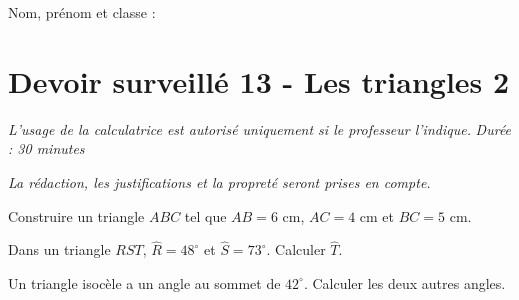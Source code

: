 \documentclass[a4paper,10pt]{report}
\begin{document}
\pagestyle{empty}
\noindent Nom, prénom et classe : \dotfill

\section*{Devoir surveillé 13 - Les triangles 2}

\noindent \textit{L'usage de la calculatrice est autorisé uniquement si le professeur l'indique.} \hfill \textit{Durée : 30 minutes}

\medskip
\noindent \textit{La rédaction, les justifications et la propreté seront prises en compte.}


\begin{ex}[Construction]
Construire un triangle $ABC$ tel que $AB=6$ cm, $AC=4$ cm et $BC=5$ cm.
\medskip\noindent\grandscarreaux{\linewidth}{6cm}
\end{ex}
\begin{ex}[Angles]
Dans un triangle $RST$, $\widehat{R}=48^\circ$ et $\widehat{S}=73^\circ$. Calculer $\widehat{T}$.
\medskip\noindent\grandscarreaux{\linewidth}{3cm}
\end{ex}
\begin{ex}[Raisonner]
Un triangle isocèle a un angle au sommet de $42^\circ$. Calculer les deux autres angles.
\medskip\noindent\grandscarreaux{\linewidth}{3cm}
\end{ex}
\end{document}

